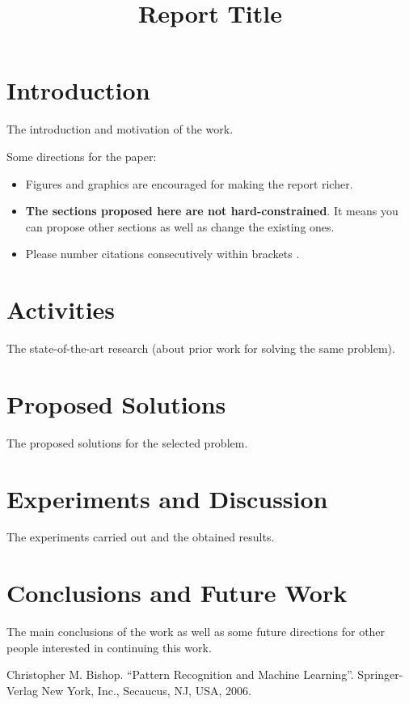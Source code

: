 \documentclass[conference]{IEEEtran}
\begin{document}
\title{Report Title}

\author{
\and
{}
}

\maketitle

\section{Introduction}

The introduction and motivation of the work. 

Some directions for the paper:

\begin{itemize}
	\item Figures and graphics are encouraged for making the
	report richer.
	\item {\bf The sections proposed here are not hard-constrained}. It means you can propose other sections as well as change the existing ones.
	\item Please number citations consecutively within brackets \cite{b1}. 
\end{itemize}

\section{Activities}
 
The state-of-the-art research (about prior work for solving the same problem).

\section{Proposed Solutions}

The proposed solutions for the selected problem.

\section{Experiments and Discussion}

The experiments carried out and the obtained
results.

\section{Conclusions and Future Work}

The main conclusions of the work as well as some future directions for other people interested in continuing this work. 

\begin{thebibliography}{00}
 Christopher M. Bishop. ``Pattern Recognition and Machine Learning''. Springer-Verlag New York, Inc., Secaucus, NJ, USA, 2006. 
\end{thebibliography}
\end{document}
